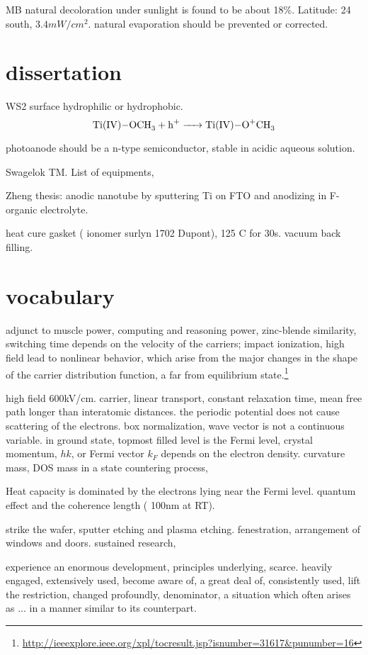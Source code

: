 MB natural decoloration under sunlight is found to be about 18\%.\cite{Nogueira1993} Latitude: 24 south, $3.4mW/cm^2$. natural evaporation should be prevented or corrected.

\section{dissertation}

WS2 surface hydrophilic or hydrophobic.
\[
\cee{Ti(IV)-OCH3 + h^+ -> Ti(IV)-O^+CH3}
\]

 photoanode should be a n-type semiconductor, stable in acidic aqueous solution.

Swagelok TM. List of equipments,

Zheng thesis:  anodic nanotube by sputtering Ti on FTO and anodizing in F-organic electrolyte.

heat cure gasket ( ionomer surlyn 1702 Dupont), 125 C for 30s.
vacuum back filling.



\section{vocabulary}


adjunct to muscle power, computing and reasoning power, zinc-blende similarity, switching time depends on the velocity of the carriers; impact ionization, high field lead to nonlinear behavior, which arise from the major changes in the shape of the carrier distribution function, a far from equilibrium state.\footnote{\url{http://ieeexplore.ieee.org/xpl/tocresult.jsp?isnumber=31617&punumber=16}}

high field 600kV/cm. carrier, linear transport, constant relaxation time, mean free path longer than interatomic distances. the periodic potential does not cause scattering of the electrons. box normalization, wave vector is not a continuous variable. in ground state, topmost filled level is the Fermi level, crystal momentum, $hk$, or Fermi vector $k_F$ depends on the electron density. curvature mass, DOS mass in a state countering process,

Heat capacity is dominated by the electrons lying near the Fermi level. quantum effect and the coherence length ( 100nm at RT).

strike the wafer, sputter etching and plasma etching. fenestration, arrangement of windows and doors. sustained research,

experience an enormous development, principles underlying, scarce. heavily engaged, extensively used, become aware of, a great deal of, consistently used, lift the restriction, changed profoundly, denominator, a situation which often arises as ... in a manner similar to its counterpart.


